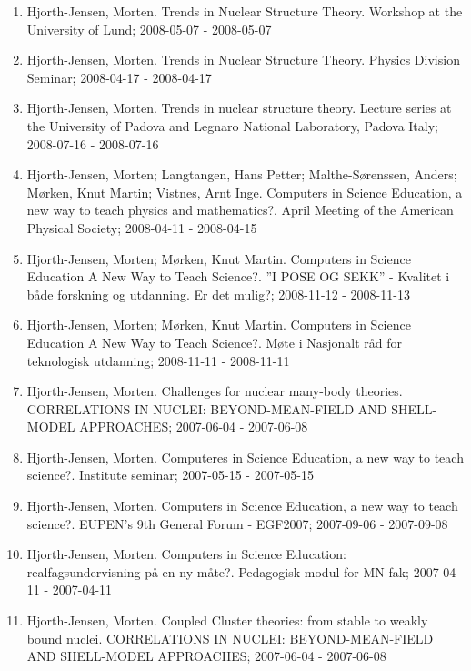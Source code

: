 \documentclass[%
oneside,                 %
final,                   %
10pt]{article}
\begin{document}
\begin{enumerate}
\item Hjorth-Jensen, Morten.  Trends in Nuclear Structure Theory. Workshop at the University of Lund; 2008-05-07 - 2008-05-07

\item Hjorth-Jensen, Morten.  Trends in Nuclear Structure Theory. Physics Division Seminar; 2008-04-17 - 2008-04-17

\item Hjorth-Jensen, Morten.  Trends in nuclear structure theory. Lecture series at the University of Padova and Legnaro National Laboratory, Padova Italy; 2008-07-16 - 2008-07-16

\item Hjorth-Jensen, Morten; Langtangen, Hans Petter; Malthe-Sørenssen, Anders; Mørken, Knut Martin; Vistnes, Arnt Inge.  Computers in Science Education, a new way to teach physics and mathematics?. April Meeting of the American Physical Society; 2008-04-11 - 2008-04-15

\item Hjorth-Jensen, Morten; Mørken, Knut Martin.  Computers in Science Education A New Way to Teach Science?. ”I POSE OG SEKK” - Kvalitet i både forskning og utdanning. Er det mulig?; 2008-11-12 - 2008-11-13

\item Hjorth-Jensen, Morten; Mørken, Knut Martin.  Computers in Science Education A New Way to Teach Science?. Møte i Nasjonalt råd for teknologisk utdanning; 2008-11-11 - 2008-11-11

\item Hjorth-Jensen, Morten.  Challenges for nuclear many-body theories. CORRELATIONS IN NUCLEI: BEYOND-MEAN-FIELD AND SHELL-MODEL APPROACHES; 2007-06-04 - 2007-06-08

\item Hjorth-Jensen, Morten.  Computeres in Science Education, a new way to teach science?. Institute seminar; 2007-05-15 - 2007-05-15

\item Hjorth-Jensen, Morten.  Computers in Science Education, a new way to teach science?. EUPEN's 9th General Forum - EGF2007; 2007-09-06 - 2007-09-08

\item Hjorth-Jensen, Morten.  Computers in Science Education: realfagsundervisning på en ny måte?. Pedagogisk modul for MN-fak; 2007-04-11 - 2007-04-11

\item Hjorth-Jensen, Morten.  Coupled Cluster theories: from stable to weakly bound nuclei. CORRELATIONS IN NUCLEI: BEYOND-MEAN-FIELD AND SHELL-MODEL APPROACHES; 2007-06-04 - 2007-06-08


\end{enumerate}
\end{document}
